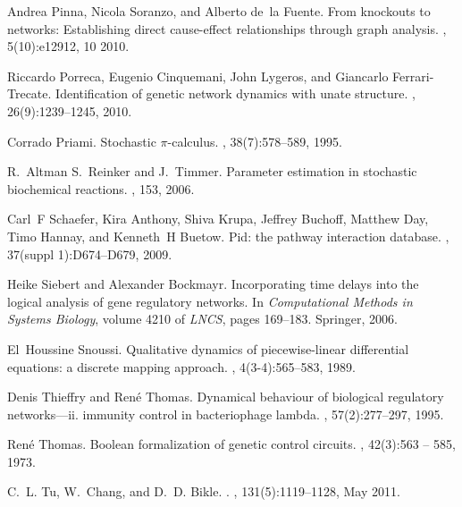 \documentclass[runningheads,a4paper]{llncs}
\begin{document}
\begin{thebibliography}{10}
Andrea Pinna, Nicola Soranzo, and Alberto de~la Fuente.
\newblock From knockouts to networks: Establishing direct cause-effect
  relationships through graph analysis.
, 5(10):e12912, 10 2010.

Riccardo Porreca, Eugenio Cinquemani, John Lygeros, and Giancarlo
  Ferrari-Trecate.
\newblock Identification of genetic network dynamics with unate structure.
, 26(9):1239--1245, 2010.

Corrado Priami.
\newblock Stochastic $\pi$-calculus.
, 38(7):578--589, 1995.

R.~Altman S.~Reinker and J.~Timmer.
\newblock Parameter estimation in stochastic biochemical reactions.
, 153, 2006.

Carl~F Schaefer, Kira Anthony, Shiva Krupa, Jeffrey Buchoff, Matthew Day, Timo
  Hannay, and Kenneth~H Buetow.
\newblock Pid: the pathway interaction database.
, 37(suppl 1):D674--D679, 2009.

Heike Siebert and Alexander Bockmayr.
\newblock Incorporating time delays into the logical analysis of gene
  regulatory networks.
\newblock In {\em Computational Methods in Systems Biology}, volume 4210 of
  {\em LNCS}, pages 169--183. Springer, 2006.

El~Houssine Snoussi.
\newblock Qualitative dynamics of piecewise-linear differential equations: a
  discrete mapping approach.
, 4(3-4):565--583, 1989.

Denis Thieffry and Ren{\'e} Thomas.
\newblock Dynamical behaviour of biological regulatory networks—ii. immunity
  control in bacteriophage lambda.
, 57(2):277--297, 1995.

Ren{\'e} Thomas.
\newblock Boolean formalization of genetic control circuits.
, 42(3):563 -- 585, 1973.

C.~L. Tu, W.~Chang, and D.~D. Bikle.
.
, 131(5):1119--1128, May 2011.


\end{thebibliography}
\end{document}

